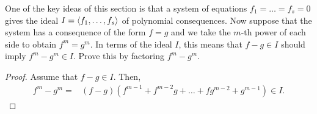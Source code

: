\begin{exercise}{19}
One of the key ideas of this section is that a system of equations $f_1 = \dots = f_s = 0$ gives the ideal $I=\langle f_1,\dots,f_s\rangle$ of polynomial consequences. 
Now suppose that the system has a consequence of the form $f=g$ and we take the $m$-th power of each side to obtain $f^m = g^m$. 
In terms of the ideal $I$, this means that $f-g\in I$ should imply $f^m - g^m\in I$. 
Prove this by factoring $f^m - g^m$.    
\end{exercise}
\begin{proof}
    Assume that $f-g\in I$. Then,
    \begin{align*}
        f^m - g^m
        =& (f-g)(f^{m-1} + f^{m-2}g + \dots + fg^{m-2} + g^{m-1}) \in I.
    \end{align*}
\end{proof}































